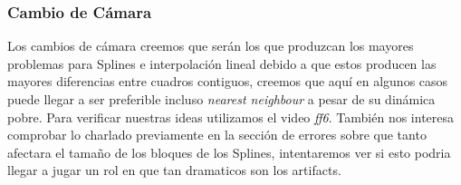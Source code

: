 \subsubsection{Cambio de Cámara}

Los cambios de cámara creemos que serán los que produzcan los mayores problemas para Splines e interpolación lineal debido a que estos producen las mayores diferencias entre cuadros contiguos, creemos que aquí en algunos casos puede llegar a ser preferible incluso \textit{nearest neighbour} a pesar de su dinámica pobre. Para verificar nuestras ideas utilizamos el video \textit{ff6}.
También nos interesa comprobar lo charlado previamente en la sección de errores sobre que tanto afectara el tamaño de los bloques de los Splines, intentaremos ver si esto podria llegar a jugar un rol en que tan dramaticos son los artifacts.



